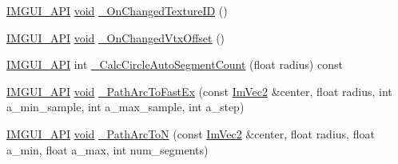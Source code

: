 \begin{DoxyCompactItemize}
\item 
\hyperlink{imgui_8h_a43829975e84e45d1149597467a14bbf5}{I\+M\+G\+U\+I\+\_\+\+A\+PI} \hyperlink{imgui__impl__opengl3__loader_8h_ac668e7cffd9e2e9cfee428b9b2f34fa7}{void} \hyperlink{structImDrawList_a7c14ae666a0df75214ecb97cdb9bd8f4}{\+\_\+\+On\+Changed\+Texture\+ID} ()
\item 
\hyperlink{imgui_8h_a43829975e84e45d1149597467a14bbf5}{I\+M\+G\+U\+I\+\_\+\+A\+PI} \hyperlink{imgui__impl__opengl3__loader_8h_ac668e7cffd9e2e9cfee428b9b2f34fa7}{void} \hyperlink{structImDrawList_a7f2e315f147acd8b555d86d1557659cc}{\+\_\+\+On\+Changed\+Vtx\+Offset} ()
\item 
\hyperlink{imgui_8h_a43829975e84e45d1149597467a14bbf5}{I\+M\+G\+U\+I\+\_\+\+A\+PI} int \hyperlink{structImDrawList_a52afa32aaab6d581cda90dc5d8726ed6}{\+\_\+\+Calc\+Circle\+Auto\+Segment\+Count} (float radius) const
\item 
\hyperlink{imgui_8h_a43829975e84e45d1149597467a14bbf5}{I\+M\+G\+U\+I\+\_\+\+A\+PI} \hyperlink{imgui__impl__opengl3__loader_8h_ac668e7cffd9e2e9cfee428b9b2f34fa7}{void} \hyperlink{structImDrawList_ac25f3a7693ed13ba2dac455675be8654}{\+\_\+\+Path\+Arc\+To\+Fast\+Ex} (const \hyperlink{structImVec2}{Im\+Vec2} \&center, float radius, int a\+\_\+min\+\_\+sample, int a\+\_\+max\+\_\+sample, int a\+\_\+step)
\item 
\hyperlink{imgui_8h_a43829975e84e45d1149597467a14bbf5}{I\+M\+G\+U\+I\+\_\+\+A\+PI} \hyperlink{imgui__impl__opengl3__loader_8h_ac668e7cffd9e2e9cfee428b9b2f34fa7}{void} \hyperlink{structImDrawList_a855fcd28cd12b81975e8a61ea2e80e96}{\+\_\+\+Path\+Arc\+ToN} (const \hyperlink{structImVec2}{Im\+Vec2} \&center, float radius, float a\+\_\+min, float a\+\_\+max, int num\+\_\+segments)
\end{DoxyCompactItemize}
